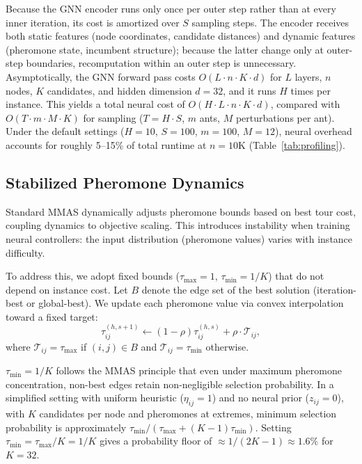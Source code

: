 \documentclass[sigconf,anonymous,review]{acmart}
\theoremstyle{definition}
\theoremstyle{plain}
\newcommand{\MMAS}{\textsc{MMAS}}
\begin{document}
Because the GNN encoder runs only once per outer step rather than at every inner iteration, its cost is amortized over $S$ sampling steps.
The encoder receives both static features (node coordinates, candidate distances) and dynamic features (pheromone state, incumbent structure); because the latter change only at outer-step boundaries, recomputation within an outer step is unnecessary.
Asymptotically, the GNN forward pass costs $O(L \cdot n \cdot K \cdot d)$ for $L$ layers, $n$ nodes, $K$ candidates, and hidden dimension $d=32$, and it runs $H$ times per instance.
This yields a total neural cost of $O(H \cdot L \cdot n \cdot K \cdot d)$, compared with $O(T \cdot m \cdot M \cdot K)$ for sampling ($T = H \cdot S$, $m$ ants, $M$ perturbations per ant).
Under the default settings ($H=10$, $S=100$, $m=100$, $M=12$), neural overhead accounts for roughly 5--15\% of total runtime at $n=10$K (Table~\ref{tab:profiling}).

\subsection{Stabilized Pheromone Dynamics}
\label{sec:smoothed-mmas}
Standard \MMAS{} dynamically adjusts pheromone bounds based on best tour cost, coupling dynamics to objective scaling.
This introduces instability when training neural controllers: the input distribution (pheromone values) varies with instance difficulty.

To address this, we adopt fixed bounds ($\tau_{\max}=1$, $\tau_{\min}=1/K$) that do not depend on instance cost.
Let $B$ denote the edge set of the best solution (iteration-best or global-best).
We update each pheromone value via convex interpolation toward a fixed target:
\begin{equation}
\tau^{(h,s+1)}_{ij} \leftarrow (1-\rho)\tau^{(h,s)}_{ij} + \rho \cdot \mathcal{T}_{ij},
\label{eq:smoothed-mmas}
\end{equation}
where $\mathcal{T}_{ij} = \tau_{\max}$ if $(i,j) \in B$ and $\mathcal{T}_{ij} = \tau_{\min}$ otherwise.

$\tau_{\min} = 1/K$ follows the \MMAS{} principle that even under maximum pheromone concentration, non-best edges retain non-negligible selection probability.
In a simplified setting with uniform heuristic ($\eta_{ij} = 1$) and no neural prior ($z_{ij} = 0$), with $K$ candidates per node and pheromones at extremes, minimum selection probability is approximately $\tau_{\min} / (\tau_{\max} + (K-1)\tau_{\min})$.
Setting $\tau_{\min} = \tau_{\max}/K = 1/K$ gives a probability floor of $\approx 1/(2K-1) \approx 1.6\%$ for $K=32$.
\end{document}
